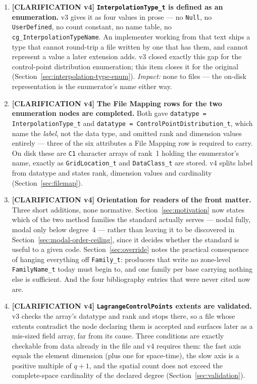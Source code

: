 \documentclass[11pt,letterpaper]{article}
\newif\ifvfourdraft
\newenvironment{v4block}{\ifvfourdraft\color{v4violet}\fi\ignorespaces}{\par}
\newcommand{\CLARIFYIV}{\ifvfourdraft
  \textcolor{v4violet}{\textbf{[CLARIFICATION v4]}}\else
  \textcolor{clarifybrown}{\textbf{[CLARIFICATION v4]}}\fi}
\begin{document}
{\begin{v4block}
\begin{enumerate}[leftmargin=1.4em,itemsep=0.5em]
  \item \CLARIFYIV{} \textbf{\texttt{InterpolationType\_t} is defined as an
    enumeration.}  v3 gives it as four values in prose --- no \texttt{Null}, no
    \texttt{UserDefined}, no count constant, no name table, no
    \texttt{cg\_InterpolationTypeName}.  An implementer working from that text
    ships a type that cannot round-trip a file written by one that has them, and
    cannot represent a value a later extension adds.  v3 closed exactly this gap
    for the control-point distribution enumeration; this item closes it for the
    original (Section~\ref{sec:interpolation-type-enum}).  \textit{Impact:} none
    to files --- the on-disk representation is the enumerator's name either way.

  \item \CLARIFYIV{} \textbf{The File Mapping rows for the two enumeration nodes
    are completed.}  Both gave \texttt{datatype = InterpolationType\_t} and
    \texttt{datatype = ControlPointDistribution\_t}, which name the \emph{label},
    not the data type, and omitted rank and dimension values entirely --- three of
    the six attributes a File Mapping row is required to carry.  On disk these are
    \texttt{C1} character arrays of rank~1 holding the enumerator's name, exactly
    as \texttt{GridLocation\_t} and \texttt{DataClass\_t} are stored.  v4 splits
    label from datatype and states rank, dimension values and cardinality
    (Section~\ref{sec:filemap}).

  \item \CLARIFYIV{} \textbf{Orientation for readers of the front matter.}  Three
    short additions, none normative.  Section~\ref{sec:motivation} now states which
    of the two method families the standard actually serves --- nodal fully, modal
    only below degree~4 --- rather than leaving it to be discovered in
    Section~\ref{sec:modal-order-ceiling}, since it decides whether the standard is
    useful to a given code.  Section~\ref{sec:override} notes the practical
    consequence of hanging everything off \texttt{Family\_t}: producers that write
    no zone-level \texttt{FamilyName\_t} today must begin to, and one family per
    base carrying nothing else is sufficient.  And the four bibliography entries
    that were never cited now are.

  \item \CLARIFYIV{} \textbf{\texttt{LagrangeControlPoints} extents are
    validated.}  v3 checks the array's datatype and rank and stops there, so a
    file whose extents contradict the node declaring them is accepted and
    surfaces later as a mis-sized field array, far from its cause.  Three
    conditions are exactly checkable from data already in the file and v4
    requires them: the fast axis equals the element dimension (plus one for
    space-time), the slow axis is a positive multiple of $q+1$, and the spatial
    count does not exceed the complete-space cardinality of the declared degree
    (Section~\ref{sec:validation}).


\end{enumerate}
\end{v4block}}
\end{document}
